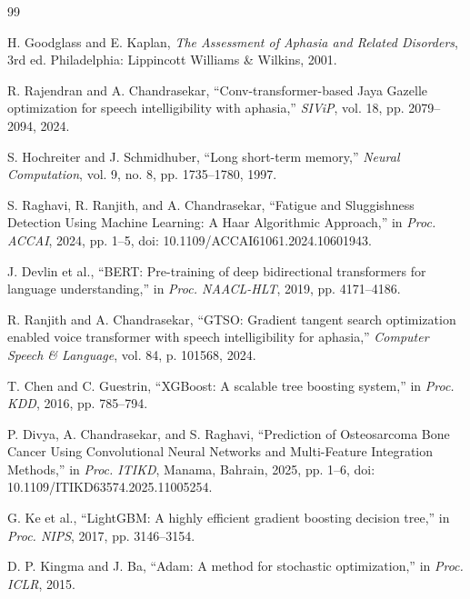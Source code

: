 \documentclass[conference]{IEEEtran}
\begin{document}
\begin{thebibliography}{99}

H. Goodglass and E. Kaplan, \textit{The Assessment of Aphasia and Related Disorders}, 3rd ed. Philadelphia: Lippincott Williams \& Wilkins, 2001.

R. Rajendran and A. Chandrasekar, ``Conv-transformer-based Jaya Gazelle optimization for speech intelligibility with aphasia,'' \textit{SIViP}, vol. 18, pp. 2079--2094, 2024.

S. Hochreiter and J. Schmidhuber, ``Long short-term memory,'' \textit{Neural Computation}, vol. 9, no. 8, pp. 1735--1780, 1997.

S. Raghavi, R. Ranjith, and A. Chandrasekar, ``Fatigue and Sluggishness Detection Using Machine Learning: A Haar Algorithmic Approach,'' in \textit{Proc. ACCAI}, 2024, pp. 1--5, doi: 10.1109/ACCAI61061.2024.10601943.

J. Devlin et al., ``BERT: Pre-training of deep bidirectional transformers for language understanding,'' in \textit{Proc. NAACL-HLT}, 2019, pp. 4171--4186.

R. Ranjith and A. Chandrasekar, ``GTSO: Gradient tangent search optimization enabled voice transformer with speech intelligibility for aphasia,'' \textit{Computer Speech \& Language}, vol. 84, p. 101568, 2024.

T. Chen and C. Guestrin, ``XGBoost: A scalable tree boosting system,'' in \textit{Proc. KDD}, 2016, pp. 785--794.

P. Divya, A. Chandrasekar, and S. Raghavi, ``Prediction of Osteosarcoma Bone Cancer Using Convolutional Neural Networks and Multi-Feature Integration Methods,'' in \textit{Proc. ITIKD}, Manama, Bahrain, 2025, pp. 1--6, doi: 10.1109/ITIKD63574.2025.11005254.

G. Ke et al., ``LightGBM: A highly efficient gradient boosting decision tree,'' in \textit{Proc. NIPS}, 2017, pp. 3146--3154.

D. P. Kingma and J. Ba, ``Adam: A method for stochastic optimization,'' in \textit{Proc. ICLR}, 2015.

\end{thebibliography}
\end{document}
